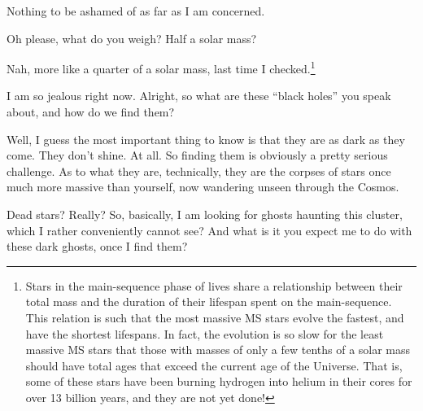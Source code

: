 \documentclass[main.tex]{subfiles}
\begin{document}
\par \Enrico Nothing to be ashamed of as far as I am concerned.

\par \Sterope Oh please, what do you weigh?  Half a solar mass?

\par \Enrico Nah, more like a quarter of a solar mass, last time I checked.\footnote{Stars in the main-sequence phase of lives share a relationship between their total mass and the duration of their lifespan spent on the main-sequence.  This relation is such that the most massive MS stars evolve the fastest, and have the shortest lifespans.  In fact, the evolution is so slow for the least massive MS stars that those with masses of only a few tenths of a solar mass should have total ages that exceed the current age of the Universe.  That is, some of these stars have been burning hydrogen into helium in their cores for over 13 billion years, and they are not yet done!}

\par \Sterope I am so jealous right now.  Alright, so what are these ``black holes'' you speak about, and how do we find them?

\par \Enrico Well, I guess the most important thing to know is that they are as dark as they come.  They don't shine.  At all.  So finding them is obviously a pretty serious challenge.  As to what they are, technically, they are the corpses of stars once much more massive than yourself, now wandering unseen through the Cosmos.

\par \Sterope  Dead stars?  Really?  So, basically, I am looking for ghosts haunting this cluster, which I rather conveniently cannot see?  And what is it you expect me to do with these dark ghosts, once I find them?
\end{document}
